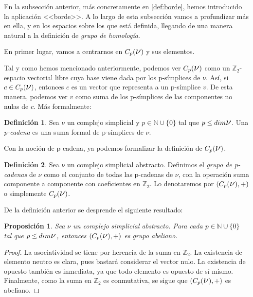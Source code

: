 \documentclass[12pt, a4paper]{article}
\numberwithin{equation}{section}
\theoremstyle{definition}
\newtheorem{defi}{Definición}
\theoremstyle{remark}
\theoremstyle{plain}
\newtheorem{prop}{Proposición}
\begin{document}
	En la subsección anterior, más concretamente en \ref{def:borde}, hemos 
	introducido la aplicación <<borde>>. A lo largo de esta subsección 
	vamos a profundizar más en ella, y en los espacios sobre los que está
	definida, llegando de una manera natural a la definición de 
	\emph{grupo de homología}.

	En primer lugar, vamos a centrarnos en 
	$C_{p}(\text{{\Large $\nu$}})$ y sus elementos.

	Tal y como hemos mencionado anteriormente, podemos ver 
	$C_{p}(\text{{\Large $\nu$}})$ como un $\mathbb{Z}_{2}$-espacio 
	vectorial libre cuya base viene dada por los p-símplices de 
	{\Large $\nu$}. Así, si $c \in C_{p}(\text{{\Large $\nu$}})$, entonces
	$c$ es un vector que representa a un p-símplice $v$. De esta manera,
	podemos ver $v$ como suma de los p-símplices de las componentes no 
	nulas de $c$. Más formalmente:

	\begin{defi}
		Sea {\Large $\nu$} un complejo simplicial y $p \in \mathbb{N}
		\cup\{0\}$ 
		tal que $p\leq dim \text{{\Large $\nu$}}$. Una 
		\textit{p-cadena} es una suma formal de p-símplices de 
		{\Large $\nu$}.
	\end{defi}
	
	Con la noción de p-cadena, ya podemos formalizar la definición de 
	$C_{p}(\text{{\Large $\nu$}})$. 

	\begin{defi}
		Sea {\Large $\nu$} un complejo simplicial abstracto. Definimos
		el \textit{grupo de p-cadenas} de {\Large $\nu$} como el 
		conjunto de todas las p-cadenas de 
		{\Large $\nu$}, con la operación suma componente a componente 
		con coeficientes en $\mathbb{Z}_{2}$. Lo denotaremos por 
		$(C_{p}(\text{{\Large $\nu$}}), +)$ o simplemente 
		$C_{p}(\text{{\Large $\nu$}})$.
	\end{defi}

	De la definición anterior se desprende el siguiente resultado:

	\begin{prop}
		\label{prop:abel}
		Sea {\Large $\nu$} un complejo simplicial abstracto. Para cada 
		$p \in \mathbb{N}\cup\{0\}$ tal que $p \leq dim\text{{\Large $\nu$}}$, 
		entonces $(C_{p}(\text{{\Large $\nu$}}), +)$ es grupo 
		abeliano.
	\end{prop}

	\begin{proof}
		La asociatividad se tiene por herencia de la suma en 
		$\mathbb{Z}_{2}$. La existencia de elemento neutro es clara, 
		pues bastará considerar el vector nulo. La existencia de 
		opuesto también es inmediata, ya que todo elemento es opuesto 
		de sí mismo. Finalmente, como la suma en $\mathbb{Z}_{2}$ es 
		conmutativa, se sigue que $(C_{p}(\text{{\Large $\nu$}}), +)$
		es abeliano.
	\end{proof}
\end{document}
